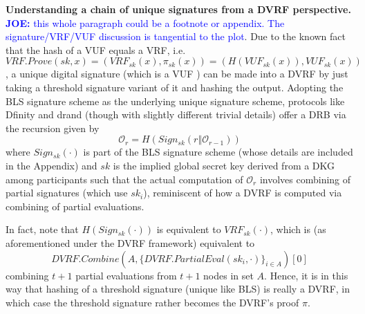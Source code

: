 \documentclass[letterpaper,twocolumn,10pt]{article}
\theoremstyle{definition}
\theoremstyle{remark}
\newcommand{\joenote}[1]{\textcolor{blue}{\textbf{JOE:} #1}}
\begin{document}
\noindent\textbf{Understanding a chain of unique signatures from a DVRF perspective.} 
\joenote{this whole paragraph could be a footnote or appendix. The signature/VRF/VUF discussion is tangential to the plot}.
Due to the known fact that the hash of a VUF equals a VRF, i.e. $VRF.Prove(sk, x) = (VRF_{sk}(x), \pi_{sk}(x)) = (H(VUF_{sk}(x)), VUF_{sk}(x))$, a unique digital signature (which is a VUF \cite{dodis2005verifiable}) can be made into a DVRF by just taking a threshold signature variant of it and hashing the output. Adopting the BLS signature scheme \cite{boneh2001short} as the underlying unique signature scheme, protocols like Dfinity \cite{hanke2018dfinity} and drand \cite{drand} (though with slightly different trivial details) offer a DRB via the recursion given by
\[
\mathcal{O}_r = H(Sign_{sk}(r \mathbin\Vert \mathcal{O}_{r - 1}))
\]
where $Sign_{sk}(\cdot)$ is part of the BLS signature scheme (whose details are included in the Appendix) and $sk$ is the implied global secret key derived from a DKG among participants such that the actual computation of $\mathcal{O}_r$ involves combining of partial signatures (which use $sk_i$), reminiscent of how a DVRF is computed via combining of partial evaluations.

In fact, note that $H(Sign_{sk}(\cdot))$ is equivalent to $VRF_{sk}(\cdot)$, which is (as aforementioned under the DVRF framework) equivalent to
\[
DVRF.Combine(A, \{DVRF.PartialEval(sk_i, \cdot)\}_{i \in A})[0]
\]
combining $t + 1$ partial evaluations from $t + 1$ nodes in set $A$. Hence, it is in this way that hashing of a threshold signature (unique like BLS) is really a DVRF, in which case the threshold signature rather becomes the DVRF's proof $\pi$.\\
\end{document}
